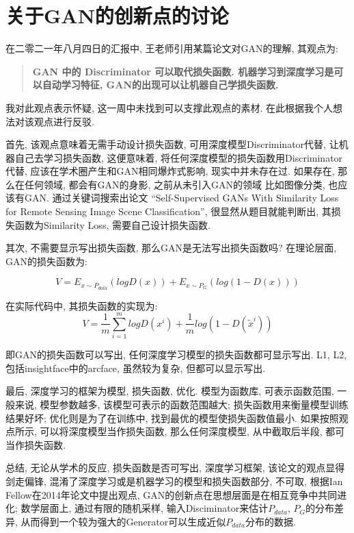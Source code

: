 \section{关于GAN的创新点的讨论}

在二零二一年八月四日的汇报中, 王老师引用某篇论文对GAN的理解, 其观点为:

\begin{quotation}
    \bfseries
    GAN 中的 Discriminator 可以取代损失函数. 机器学习到深度学习是可以自动学习特征, GAN的出现可以让机器自己学损失函数. 
\end{quotation}  

我对此观点表示怀疑, 这一周中未找到可以支撑此观点的素材. 在此根据我个人想法对该观点进行反驳.

首先, 该观点意味着无需手动设计损失函数, 可用深度模型Discriminator代替, 让机器自己去学习损失函数, 这便意味着, 将任何深度模型的损失函数用Discriminator代替, 应该在学术圈产生和GAN相同爆炸式影响, 现实中并未存在过. 如果存在, 那么在任何领域, 都会有GAN的身影, 之前从未引入GAN的领域 比如图像分类, 也应该有GAN. 通过关键词搜索出论文 ``Self-Supervised GANs With Similarity Loss for Remote Sensing Image Scene Classification'', 很显然从题目就能判断出, 其损失函数为Similarity Loss, 需要自己设计损失函数.

其次, 不需要显示写出损失函数, 那么GAN是无法写出损失函数吗? 在理论层面, GAN的损失函数为:

\begin{equation}
    V = E_{x\sim P_{data}}(logD(x)) + E_{x\sim P_{G}}( log(1-D(x)))
\end{equation}

在实际代码中, 其损失函数的实现为:
\begin{equation}
    V=\frac{1}{m}\sum_{i=1}^{m}logD(x^{i})+\frac{1}{m}log(1-D(\tilde{x}^{i}))
\end{equation}

即GAN的损失函数可以写出, 任何深度学习模型的损失函数都可显示写出. L1, L2, 包括insightface中的arcface, 虽然较为复杂, 但都可以显示写出.

最后, 深度学习的框架为模型, 损失函数, 优化. 模型为函数库, 可表示函数范围, 一般来说, 模型参数越多, 该模型可表示的函数范围越大; 损失函数用来衡量模型训练结果好坏; 优化则是为了在训练中, 找到最优的模型使损失函数值最小. 如果按照观点所示, 可以将深度模型当作损失函数, 那么任何深度模型, 从中截取后半段, 都可当作损失函数. 

总结, 无论从学术的反应, 损失函数是否可写出, 深度学习框架, 该论文的观点显得剑走偏锋, 混淆了深度学习或是机器学习的模型和损失函数部分, 不可取, 根据Ian Fellow在2014年论文中提出观点, GAN的创新点在思想层面是在相互竞争中共同进化; 数学层面上, 通过有限的随机采样, 输入Disciminator来估计$P_{data}$, $P_{G}$的分布差异, 从而得到一个较为强大的Generator可以生成近似$P_{data}$分布的数据. 


